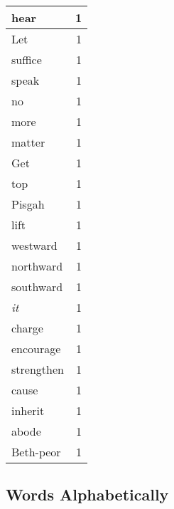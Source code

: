 \begin{center}
\begin{longtable}{l|r}
hear & 1 \\ \hline
Let & 1 \\ \hline
suffice & 1 \\ \hline
speak & 1 \\ \hline
no & 1 \\ \hline
more & 1 \\ \hline
matter & 1 \\ \hline
Get & 1 \\ \hline
top & 1 \\ \hline
Pisgah & 1 \\ \hline
lift & 1 \\ \hline
westward & 1 \\ \hline
northward & 1 \\ \hline
southward & 1 \\ \hline
\emph{it} & 1 \\ \hline
charge & 1 \\ \hline
encourage & 1 \\ \hline
strengthen & 1 \\ \hline
cause & 1 \\ \hline
inherit & 1 \\ \hline
abode & 1 \\ \hline
Beth-peor & 1 \\ \hline
\end{longtable}
\end{center}



\normalsize



\subsection{Words Alphabetically}
 
